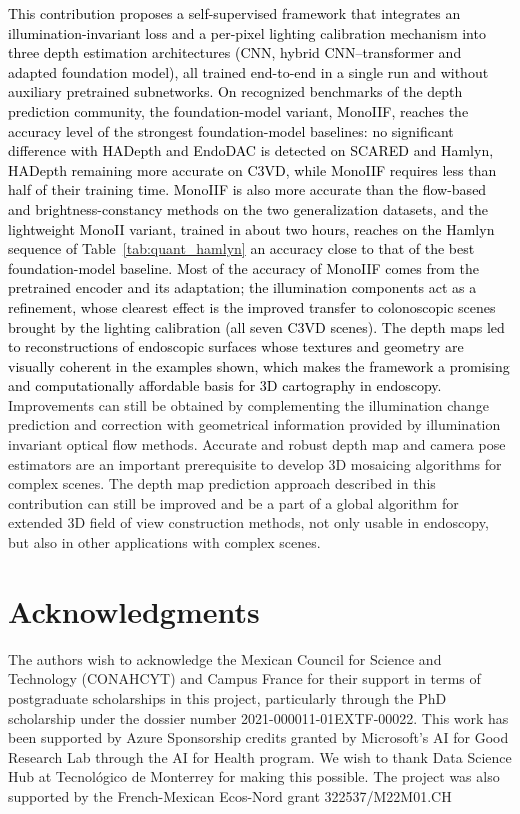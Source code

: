 \documentclass[a4paper,fleqn]{cas-dc}
\begin{document}
\textcolor{black}{This contribution proposes a self-supervised framework that integrates an illumination-invariant loss and a per-pixel lighting calibration mechanism into three depth estimation architectures (CNN, hybrid CNN--transformer and adapted foundation model), all trained end-to-end in a single run and without auxiliary pretrained subnetworks. On recognized benchmarks of the depth prediction community, the foundation-model variant, MonoIIF, reaches the accuracy level of the strongest foundation-model baselines: no significant difference with HADepth and EndoDAC is detected on SCARED and Hamlyn, HADepth remaining more accurate on C3VD, while MonoIIF requires less than half of their training time. MonoIIF is also more accurate than the flow-based and brightness-constancy methods on the two generalization datasets, and the lightweight MonoII variant, trained in about two hours, reaches on the Hamlyn sequence of Table~\ref{tab:quant_hamlyn} an accuracy close to that of the best foundation-model baseline. Most of the accuracy of MonoIIF comes from the pretrained encoder and its adaptation; the illumination components act as a refinement, whose clearest effect is the improved transfer to colonoscopic scenes brought by the lighting calibration (all seven C3VD scenes). The depth maps led to reconstructions of endoscopic surfaces whose textures and geometry are visually coherent in the examples shown, which makes the framework a promising and computationally affordable basis for 3D cartography in endoscopy.} Improvements can still be obtained by complementing the illumination change prediction and correction with geometrical information provided by illumination invariant optical flow methods. Accurate and robust depth map and camera pose estimators are an important prerequisite to develop 3D mosaicing algorithms for complex scenes. The depth map prediction approach described in this contribution can still be improved and be a part of a global algorithm for extended 3D field of view construction methods, not only usable in endoscopy, but also in other applications with complex scenes.  


\section*{Acknowledgments}

The authors wish to acknowledge the Mexican Council for Science and Technology (CONAHCYT) and Campus France for their support in terms of postgraduate scholarships in this project, particularly through the PhD scholarship under the dossier number 2021-000011-01EXTF-00022. This work has been supported by Azure Sponsorship credits granted by Microsoft’s AI for Good Research Lab through the AI for Health program. We wish to thank Data Science Hub at Tecnológico de Monterrey for making this possible. The project was also supported by the French-Mexican Ecos-Nord grant  322537/M22M01.CH
\end{document}
